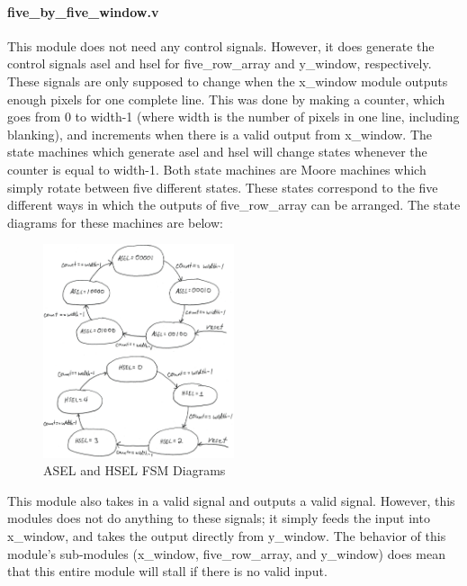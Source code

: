\paragraph{five\_by\_five\_window.v}
This module does not need any control signals. However, it does generate the 
control signals asel and hsel for five\_row\_array and y\_window, respectively. 
These signals are only supposed to change when the x\_window module outputs 
enough pixels for one complete line. This was done by making a counter, which 
goes from 0 to width-1 (where width is the number of pixels in one line, 
including blanking), and increments when there is a valid output from x\_window. 
The state machines which generate asel and hsel will change states whenever the 
counter is equal to width-1. Both state machines are Moore machines which simply 
rotate between five different states. These states correspond to the five 
different ways in which the outputs of five\_row\_array can be arranged. The state 
diagrams for these machines are below:

\begin{figure}
    \includegraphics[width=0.5\textwidth]{processed_image_pngs/sel_states.png}
    \caption{ASEL and HSEL FSM Diagrams}
    \label{fig:sel_states}
\end{figure}



This module also takes in a valid signal and outputs a valid signal. However, 
this modules does not do anything to these signals; it simply feeds the input 
into x\_window, and takes the output directly from y\_window. The behavior of this 
module's sub-modules (x\_window, five\_row\_array, and y\_window) does mean that 
this entire module will stall if there is no valid input.


